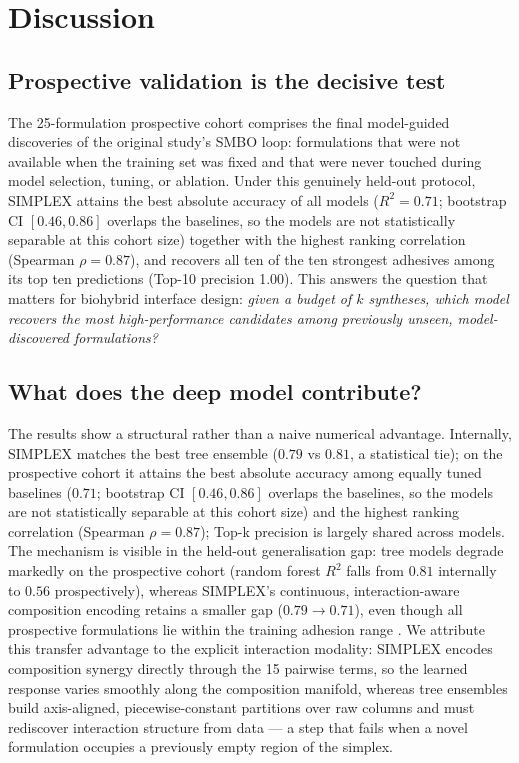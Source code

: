 \documentclass[utf8]{FrontiersinHarvard}
\begin{document}
\section{Discussion}

\subsection{Prospective validation is the decisive test}

The 25-formulation prospective cohort comprises the final model-guided discoveries of the original study's SMBO loop: formulations that were not available when the training set was fixed and that were never touched during model selection, tuning, or ablation. Under this genuinely held-out protocol, SIMPLEX attains the best absolute accuracy of all models ($R^2 = 0.71$; bootstrap CI $[0.46, 0.86]$ overlaps the baselines, so the models are not statistically separable at this cohort size) together with the highest ranking correlation (Spearman $\rho = 0.87$), and recovers all ten of the ten strongest adhesives among its top ten predictions (Top-10 precision 1.00). This answers the question that matters for biohybrid interface design: \emph{given a budget of $k$ syntheses, which model recovers the most high-performance candidates among previously unseen, model-discovered formulations?}

\subsection{What does the deep model contribute?}

The results show a structural rather than a naive numerical advantage. Internally, SIMPLEX matches the best tree ensemble ($0.79$ vs $0.81$, a statistical tie); on the prospective cohort it attains the best absolute accuracy among equally tuned baselines ($0.71$; bootstrap CI $[0.46, 0.86]$ overlaps the baselines, so the models are not statistically separable at this cohort size) and the highest ranking correlation (Spearman $\rho = 0.87$); Top-k precision is largely shared across models. The mechanism is visible in the held-out generalisation gap: tree models degrade markedly on the prospective cohort (random forest $R^2$ falls from $0.81$ internally to $0.56$ prospectively), whereas SIMPLEX's continuous, interaction-aware composition encoding retains a smaller gap ($0.79 \rightarrow 0.71$), even though all prospective formulations lie within the training adhesion range \cite{cai2021bioadhesives,maier2015saltdisplacement,zhao2016polyelectrolyte,lee2007mussel,waite2017mussel,gong2010doublenetwork,lakes1993materials,narayanan2021underwater,zhang2020catechol}. We attribute this transfer advantage to the explicit interaction modality: SIMPLEX encodes composition synergy directly through the 15 pairwise terms, so the learned response varies smoothly along the composition manifold, whereas tree ensembles build axis-aligned, piecewise-constant partitions over raw columns and must rediscover interaction structure from data --- a step that fails when a novel formulation occupies a previously empty region of the simplex.
\end{document}
